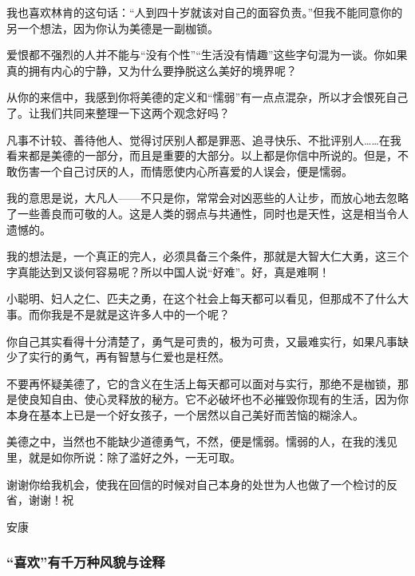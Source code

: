 \par {}
\par 我也喜欢林肯的这句话：“人到四十岁就该对自己的面容负责。”但我不能同意你的另一个想法，因为你认为美德是一副枷锁。
\par 爱恨都不强烈的人并不能与“没有个性”“生活没有情趣”这些字句混为一谈。你如果真的拥有内心的宁静，又为什么要挣脱这么美好的境界呢？
\par 从你的来信中，我感到你将美德的定义和“懦弱”有一点点混杂，所以才会恨死自己了。让我们共同来整理一下这两个观念好吗？
\par 凡事不计较、善待他人、觉得讨厌别人都是罪恶、追寻快乐、不批评别人……在我看来都是美德的一部分，而且是重要的大部分。以上都是你信中所说的。但是，不敢伤害一个自己讨厌的人，而情愿使内心所喜爱的人误会，便是懦弱。
\par 我的意思是说，大凡人——不只是你，常常会对凶恶些的人让步，而放心地去忽略了一些善良而可敬的人。这是人类的弱点与共通性，同时也是天性，这是相当令人遗憾的。
\par 我的想法是，一个真正的完人，必须具备三个条件，那就是大智大仁大勇，这三个字真能达到又谈何容易呢？所以中国人说“好难”。好，真是难啊！
\par 小聪明、妇人之仁、匹夫之勇，在这个社会上每天都可以看见，但那成不了什么大事。而你我是不是就是这许多人中的一个呢？
\par 你自己其实看得十分清楚了，勇气是可贵的，极为可贵，又最难实行，如果凡事缺少了实行的勇气，再有智慧与仁爱也是枉然。
\par 不要再怀疑美德了，它的含义在生活上每天都可以面对与实行，那绝不是枷锁，那是使良知自由、使心灵释放的秘方。它不必破坏也不必摧毁你现有的生活，因为你本身在基本上已是一个好女孩子，一个居然以自己美好而苦恼的糊涂人。
\par 美德之中，当然也不能缺少道德勇气，不然，便是懦弱。懦弱的人，在我的浅见里，就是如你所说：除了滥好之外，一无可取。
\par 谢谢你给我机会，使我在回信的时候对自己本身的处世为人也做了一个检讨的反省，谢谢！祝
\par 安康
\par {}


\subsubsection{“喜欢”有千万种风貌与诠释}

